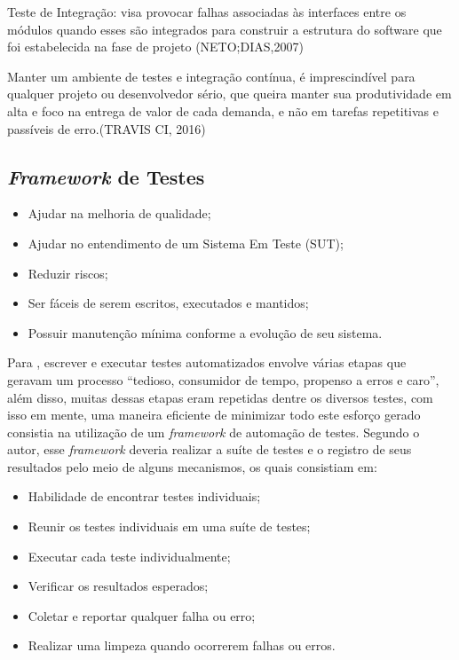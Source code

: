         Teste de Integração: visa provocar falhas associadas às interfaces entre os módulos quando esses são integrados para construir a estrutura do software que foi estabelecida na fase de projeto 
        (NETO;DIAS,2007)

        Manter um ambiente de testes e integração contínua, é imprescindível para qualquer projeto ou desenvolvedor sério, que queira manter sua produtividade em alta e foco na entrega de valor de cada demanda, e não em tarefas repetitivas e passíveis de erro.(TRAVIS CI, 2016)


    \subsection{\textit{Framework} de Testes}
        

        \begin{itemize}

        \item Ajudar na melhoria de qualidade;
        \item Ajudar no entendimento de um Sistema Em Teste (SUT);
        \item Reduzir riscos;
        \item Ser fáceis de serem escritos, executados e mantidos;
        \item Possuir manutenção mínima conforme a evolução de seu sistema.

        \end{itemize}

        Para , escrever e executar testes automatizados envolve várias etapas que geravam um processo “tedioso, consumidor de tempo, propenso a erros e caro”, além disso, muitas dessas etapas eram repetidas dentre os diversos testes, com isso em mente, uma maneira eficiente de minimizar todo este esforço gerado consistia na utilização de um \textit{framework} de automação de testes. Segundo o autor, esse \textit{framework} deveria realizar a suíte de testes e o registro de seus resultados pelo meio de alguns mecanismos, os quais consistiam em:

        \begin{itemize}

        \item Habilidade de encontrar testes individuais;
        \item Reunir os testes individuais em uma suíte de testes;
        \item Executar cada teste individualmente;
        \item Verificar os resultados esperados;
        \item Coletar e reportar qualquer falha ou erro;
        \item Realizar uma limpeza quando ocorrerem falhas ou erros.

        \end{itemize}

